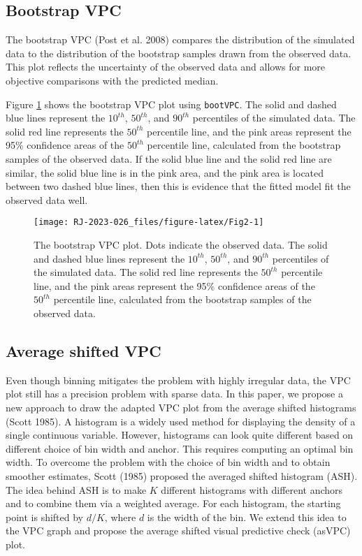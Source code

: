 \hypertarget{bootstrap-vpc}{%
\subsection{Bootstrap VPC}\label{bootstrap-vpc}}

The bootstrap VPC (Post et al. 2008) compares the distribution of the simulated data to the distribution of the bootstrap samples drawn from the observed data.
This plot reflects the uncertainty of the observed data and allows for more objective comparisons with the predicted median.

Figure \ref{fig:Fig2} shows the bootstrap VPC plot using \texttt{bootVPC}. The solid and dashed blue lines represent the \(10^{th}\), \(50^{th}\), and \(90^{th}\) percentiles of the simulated data. The solid red line represents the \(50^{th}\) percentile line, and the pink areas represent the 95\(\%\) confidence areas of the \(50^{th}\) percentile line, calculated from the bootstrap samples of the observed data. If the solid blue line and the solid red line are similar, the solid blue line is in the pink area, and the pink area is located between two dashed blue lines,
then this is evidence that the fitted model fit the observed data well.

\begin{figure}
\texttt{[image: RJ-2023-026\_files/figure-latex/Fig2-1]} \caption{The bootstrap VPC plot. Dots indicate the observed data. The solid and dashed blue lines represent the $10^{th}$, $50^{th}$, and $90^{th}$ percentiles of the simulated data. The solid red line represents the $50^{th}$ percentile line, and the pink areas represent the 95\% confidence areas of the $50^{th}$ percentile line, calculated from the bootstrap samples of the observed data.}\label{fig:Fig2}
\end{figure}

\hypertarget{average-shifted-vpc}{%
\subsection{Average shifted VPC}\label{average-shifted-vpc}}

Even though binning mitigates the problem with highly irregular data, the VPC plot still has a precision problem with sparse data. In this paper, we propose a new approach to draw the adapted VPC plot from the average shifted histograms (Scott 1985).
A histogram is a widely used method for displaying the density of a single continuous variable. However, histograms can look quite different based on different choice of bin width and anchor.
This requires computing an optimal bin width.
To overcome the problem with the choice of bin width and to obtain smoother estimates, Scott (1985) proposed the averaged shifted histogram (ASH). The idea behind ASH is to make \(K\) different histograms with different anchors and to combine them via a weighted average. For each histogram, the starting point is shifted by \(d/K\), where \(d\) is the width of the bin. We extend this idea to the VPC graph and propose the average shifted visual predictive check (asVPC) plot.

